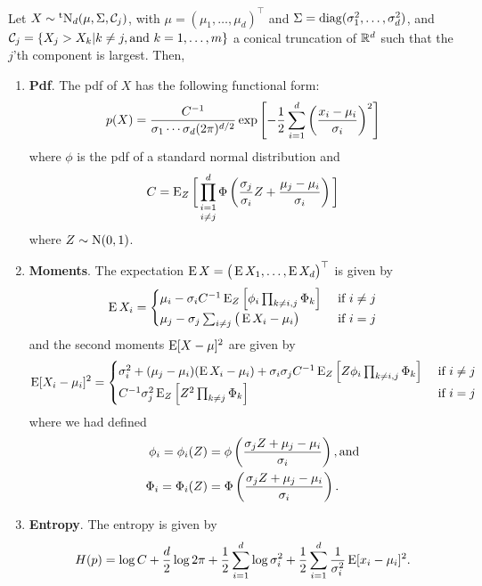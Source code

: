 \begin{lemma}\label{thm:contruncn}
  Let $X\sim \tN_d(\mu,\Sigma,\cC_j)$, with  $\mu=(\mu_1,\dots,\mu_d)^\top$ and $\Sigma = \diag(\sigma_1^2,\dots,\sigma_d^2)$, and $\cC_j = \{ X_j > X_k | k\neq j, \text{and } k=1,\dots,m  \}$ a conical truncation of $\bbR^d$ such that the $j$'th component is largest.
  Then,
  \begin{enumerate}[label=(\roman*)]
    \item \textbf{Pdf}. The pdf of $X$ has the following functional form:
    \[
    p(X) = \frac{C^{-1}}{\sigma_1 \cdots \sigma_d (2\pi)^{d/2}}\exp\left[- \half \sum_{i=1}^d \left( \frac{x_i - \mu_i}{\sigma_i} \right)^2 \right]
    \]
    where $\phi$ is the pdf of a standard normal distribution and
    \[
      C = \E_Z \bigg[ \mathop{\prod_{i=1}^d}_{i \neq j} \Phi \left(\frac{\sigma_j}{\sigma_i}Z + \frac{\mu_j - \mu_i}{\sigma_i} \right) \bigg]
    \]
    where $Z \sim \N(0,1)$. 
    \item \textbf{Moments}. The expectation $\E X = \big(\E X_1, \dots, \E X_d \big)^\top$ is given by
    \[
      \E X_i =
      \begin{cases}
        \mu_i - \sigma_i C^{-1} \E_Z \left[\phi_i 
        \prod_{k\neq i,j}
        \Phi_k \right] 
        &\text{ if } i \neq j \\
        \mu_j - \sigma_j \sum_{i \neq j} \big(\E X_i - \mu_i \big) &\text{ if } i = j \\
      \end{cases}
    \]
    and the second moments $\E [X - \mu]^2$ are given by
    \[
      \E [X_i - \mu_i]^2 =
      \begin{cases}
        \sigma_i^2 + (\mu_j-\mu_i)(\E X_i - \mu_i) 
        + \sigma_i\sigma_j C^{-1} \E_Z \left[Z \phi_i 
        \prod_{k\neq i,j}
        \Phi_k \right] 
        &\text{ if } i \neq j \\
        C^{-1} \sigma_j^2 \E_Z \left[Z^2  
        \prod_{k\neq j}
        \Phi_k \right]  &\text{ if } i = j \\
      \end{cases}        
    \]
    where we had defined
    \begin{align*}
      \phi_i = \phi_i(Z) &= \phi \left( \frac{\sigma_j Z + \mu_j - \mu_i}{\sigma_i} \right), \rlap{\text{and}} \\
      \Phi_i = \Phi_i(Z) &= \Phi \left( \frac{\sigma_j Z + \mu_j - \mu_i}{\sigma_i} \right).
    \end{align*}
    \item \textbf{Entropy}. The entropy is given by
    \[
      H(p) = \log C + \half[d] \log 2\pi + \half \sum_{i=1}^d \log \sigma_i^2 + \half \sum_{i=1}^d \frac{1}{\sigma_i^2} \E [ x_i - \mu_i ]^2.
    \]
  \end{enumerate}
\end{lemma}

